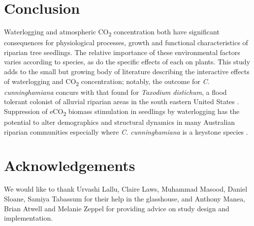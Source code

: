 \documentclass[12pt,a4paper]{memoir}
\begin{document}
\section{Conclusion}
Waterlogging and atmospheric CO\textsubscript{2} concentration both have significant consequences for physiological processes, growth and functional characteristics of riparian tree seedlings. The relative importance of these environmental factors varies according to species, as do the specific effects of each on plants. This study adds to the small but growing body of literature describing the interactive effects of waterlogging and CO\textsubscript{2} concentration; notably, the outcome for \textit{C. cunninghamiana} concurs with that found for \textit{Taxodium distichum}, a flood tolerant colonist of alluvial riparian areas in the south eastern United States \citep{Megonigal2005}. Suppression of eCO\textsubscript{2} biomass stimulation in seedlings by waterlogging has the potential to alter demographics and structural dynamics in many Australian riparian communities especially where \textit{C. cunninghamiana} is a keystone species \citep{Woolfrey2001}.

\section*{Acknowledgements}
We would like to thank Urvashi Lallu, Claire Laws, Muhammad Masood, Daniel Sloane, Samiya Tabassum for their help in the glasshouse, and Anthony Manea, Brian Atwell and Melanie Zeppel for providing advice on study design and implementation.

\clearpage

\renewcommand\bibname{{References}} 
\begin{small}


\end{small}
\end{document}
